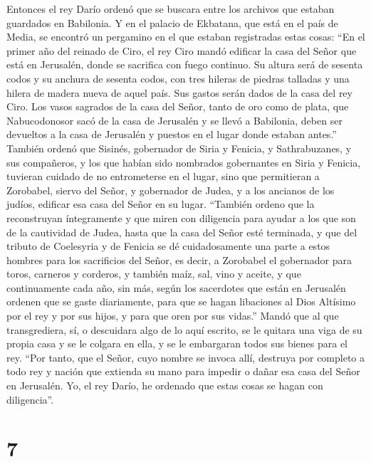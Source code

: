  Entonces el rey Darío ordenó que se buscara entre los
archivos que estaban guardados en Babilonia. Y en el palacio de
Ekbatana, que está en el país de Media, se encontró un pergamino en el
que estaban registradas estas cosas:  ``En el primer año
del reinado de Ciro, el rey Ciro mandó edificar la casa del Señor que
está en Jerusalén, donde se sacrifica con fuego continuo.
 Su altura será de sesenta codos y su anchura de sesenta
codos, con tres hileras de piedras talladas y una hilera de madera nueva
de aquel país. Sus gastos serán dados de la casa del rey Ciro.
 Los vasos sagrados de la casa del Señor, tanto de oro
como de plata, que Nabucodonosor sacó de la casa de Jerusalén y se llevó
a Babilonia, deben ser devueltos a la casa de Jerusalén y puestos en el
lugar donde estaban antes.''  También ordenó que Sisinés,
gobernador de Siria y Fenicia, y Sathrabuzanes, y sus compañeros, y los
que habían sido nombrados gobernantes en Siria y Fenicia, tuvieran
cuidado de no entrometerse en el lugar, sino que permitieran a
Zorobabel, siervo del Señor, y gobernador de Judea, y a los ancianos de
los judíos, edificar esa casa del Señor en su lugar. 
``También ordeno que la reconstruyan íntegramente y que miren con
diligencia para ayudar a los que son de la cautividad de Judea, hasta
que la casa del Señor esté terminada,  y que del tributo
de Coelesyria y de Fenicia se dé cuidadosamente una parte a estos
hombres para los sacrificios del Señor, es decir, a Zorobabel el
gobernador para toros, carneros y corderos,  y también
maíz, sal, vino y aceite, y que continuamente cada año, sin más, según
los sacerdotes que están en Jerusalén ordenen que se gaste diariamente,
 para que se hagan libaciones al Dios Altísimo por el rey
y por sus hijos, y para que oren por sus vidas.''  Mandó
que al que transgrediera, sí, o descuidara algo de lo aquí escrito, se
le quitara una viga de su propia casa y se le colgara en ella, y se le
embargaran todos sus bienes para el rey.  ``Por tanto,
que el Señor, cuyo nombre se invoca allí, destruya por completo a todo
rey y nación que extienda su mano para impedir o dañar esa casa del
Señor en Jerusalén.  Yo, el rey Darío, he ordenado que
estas cosas se hagan con diligencia''.

\hypertarget{section-6}{%
\section{7}\label{section-6}}


